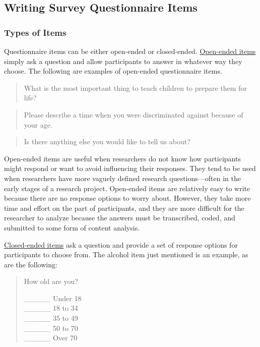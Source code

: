 \documentclass[
]{krantz}
\begin{document}
\hypertarget{writing-survey-questionnaire-items}{%
\subsection*{Writing Survey Questionnaire Items}\label{writing-survey-questionnaire-items}}


\hypertarget{types-of-items}{%
\subsubsection*{Types of Items}\label{types-of-items}}


Questionnaire items can be either open-ended or closed-ended. \protect\hyperlink{open-ended-item}{Open-ended items} simply ask a question and allow participants to answer in whatever way they choose. The following are examples of open-ended questionnaire items.

\begin{quote}
What is the most important thing to teach children to prepare them for life?
\end{quote}

\begin{quote}
Please describe a time when you were discriminated against because of your age.
\end{quote}

\begin{quote}
Is there anything else you would like to tell us about?
\end{quote}

Open-ended items are useful when researchers do not know how participants might respond or want to avoid influencing their responses. They tend to be used when researchers have more vaguely defined research questions---often in the early stages of a research project. Open-ended items are relatively easy to write because there are no response options to worry about. However, they take more time and effort on the part of participants, and they are more difficult for the researcher to analyze because the answers must be transcribed, coded, and submitted to some form of content analysis.

\protect\hyperlink{closed-endedux5cux2520item}{Closed-ended items} ask a question and provide a set of response options for participants to choose from. The alcohol item just mentioned is an example, as are the following:

\begin{quote}
How old are you?

\_\_\_\_\_ Under 18\\
\_\_\_\_\_ 18 to 34\\
\_\_\_\_\_ 35 to 49\\
\_\_\_\_\_ 50 to 70\\
\_\_\_\_\_ Over 70
\end{quote}
\end{document}
